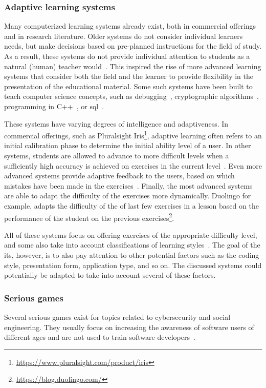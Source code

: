 \subsubsection{Adaptive learning systems}
Many computerized learning systems already exist, both in commercial offerings and in research literature.
Older systems do not consider individual learners needs, but make decisions based on pre-planned instructions for the field of study.
As a result, these systems do not provide individual attention to students as a natural (human) teacher would~\cite{mahdi2016intelligent}.
This inspired the rise of more advanced learning systems that consider both the field and the learner to provide flexibility in the presentation of the educational material.
Some such systems have been built to teach computer science concepts, such as debugging~\cite{carter2013tutoring}, cryptographic algorithms~\cite{abuel2018intelligent,mahdi2016intelligent}, programming in C++~\cite{abu2009evaluating}, or \gls{sql}~\cite{mitrovic2003intelligent}.

These systems have varying degrees of intelligence and adaptiveness.
In commercial offerings, such as Pluralsight Iris\footnote{\url{https://www.pluralsight.com/product/iris}}, adaptive learning often refers to an initial calibration phase to determine the initial ability level of a user.
In other systems, students are allowed to advance to more difficult levels when a sufficiently high accuracy is achieved on exercises in the current level~\cite{abu2009evaluating,mahdi2016intelligent}.
Even more advanced systems provide adaptive feedback to the users, based on which mistakes have been made in the exercises~\cite{carter2013tutoring,abuel2018intelligent}.
Finally, the most advanced systems are able to adapt the difficulty of the exercises more dynamically.
Duolingo for example, adapts the difficulty of the of last few exercises in a lesson based on the performance of the student on the previous exercises\footnote{\url{https://blog.duolingo.com/}}.

All of these systems focus on offering exercises of the appropriate difficulty level, and some also take into account classifications of learning styles~\cite{alshammari2015design,felder1988learning}.
The goal of the \gls{its}, however, is to also pay attention to other potential factors such as the coding style, presentation form, application type, and so on.
The discussed systems could potentially be adapted to take into account several of these factors.

\subsubsection{Serious games}
Several serious games exist for topics related to cybersecurity and social engineering.
They usually focus on increasing the awareness of software users of different ages and are not used to train software developers~\cite{giannakas2015cyberaware,jin2018evaluation,beckers2016serious,yasin2018design}.

